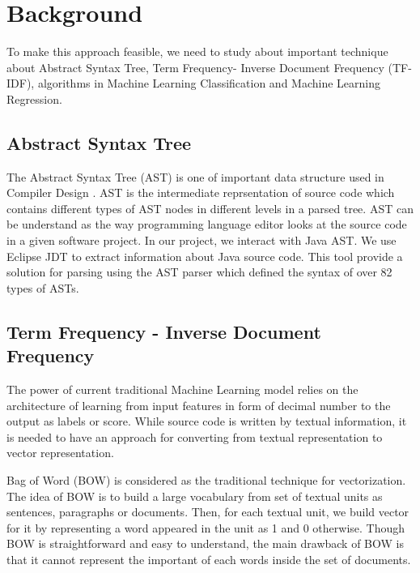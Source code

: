 \section{Background}
To make this approach feasible, we need to study about important technique about Abstract Syntax Tree, Term Frequency- Inverse Document Frequency (TF-IDF), algorithms in Machine Learning Classification and Machine Learning Regression.
\subsection{Abstract Syntax Tree}
The Abstract Syntax Tree (AST) is one of important data structure used in Compiler Design \cite{006}. AST is the intermediate reprsentation of source code which contains different types of AST nodes in different levels in a parsed tree. AST can be understand as the way programming language editor looks at the source code in a given software project. In our project, we interact with Java AST. We use Eclipse JDT \cite{007} to extract information about Java source code. This tool provide a solution for parsing using the AST parser which defined the syntax of over 82 types of ASTs. 
\subsection{Term Frequency - Inverse Document Frequency}
The power of current traditional Machine Learning model relies on the architecture of learning from input features in form of decimal number to the output as labels or score. While source code is written by textual information, it is needed to have an approach for converting from textual representation to vector representation. 

Bag of Word (BOW) \cite{007} is considered as the traditional technique for vectorization. The idea of BOW is to build a large vocabulary from set of textual units as sentences, paragraphs or documents. Then, for each textual unit, we build vector for it by representing a word appeared in the unit as 1 and 0 otherwise. Though BOW is straightforward and easy to understand, the main drawback of BOW is that it cannot represent the important of each words inside the set of documents.

